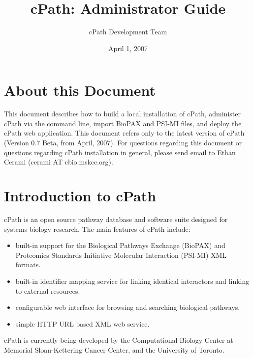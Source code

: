 \documentclass[letterpaper,12pt]{article}
\title{cPath:  Administrator Guide}
\author{cPath Development Team}
\date{April 1, 2007}
\begin{document}
\maketitle

\tableofcontents


\section{About this Document}

This document describes how to build a local installation of cPath, administer cPath via the command line, import BioPAX and PSI-MI files, and deploy the cPath web application.  This document refers only to the latest version of cPath (Version 0.7 Beta, from April, 2007).  For questions regarding this document or questions regarding cPath installation in general, please send email to Ethan Cerami (cerami AT cbio.mskcc.org).

\section{Introduction to cPath}

cPath is an open source pathway database and software suite designed for systems biology research. The main features of cPath include:

\begin{itemize}

  \item built-in support for the Biological Pathways Exchange (BioPAX) and Proteomics Standards Initiative Molecular Interaction (PSI-MI) XML formats.

  \item built-in identifier mapping service for linking identical interactors and linking to external resources.

  \item configurable web interface for browsing and searching biological pathways.

  \item simple HTTP URL based XML web service.

\end{itemize}

cPath is currently being developed by the Computational Biology Center at Memorial Sloan-Kettering Cancer Center, and the University of Toronto.

\bigskip
\end{document}
